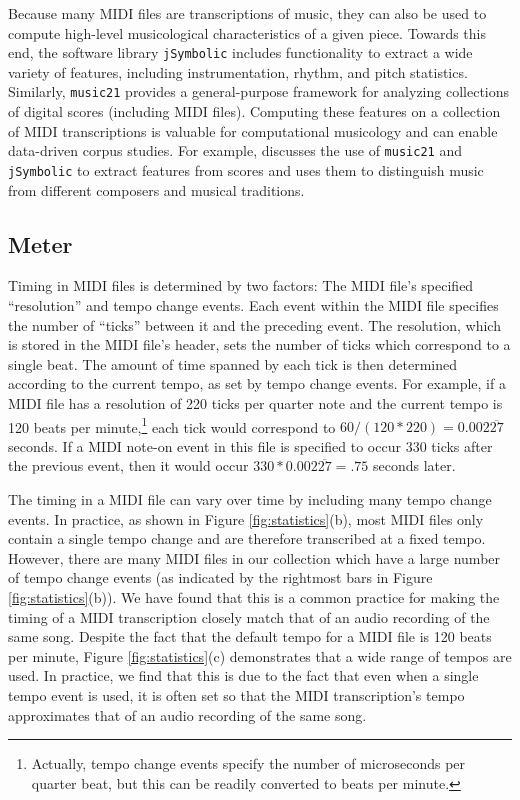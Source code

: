 \documentclass{article}
\begin{document}
Because many MIDI files are transcriptions of music, they can also be used to compute high-level musicological characteristics of a given piece.
Towards this end, the software library \texttt{jSymbolic} \cite{mckay2006jsymbolic} includes functionality to extract a wide variety of features, including instrumentation, rhythm, and pitch statistics.
Similarly, \texttt{music21} \cite{cuthbert2010music21} provides a general-purpose framework for analyzing collections of digital scores (including MIDI files).
Computing these features on a collection of MIDI transcriptions is valuable for computational musicology and can enable data-driven corpus studies.
For example, \cite{cuthbert2011feature} discusses the use of \texttt{music21} and \texttt{jSymbolic} to extract features from scores and uses them to distinguish music from different composers and musical traditions.

\subsection{Meter}

Timing in MIDI files is determined by two factors: The MIDI file's specified ``resolution'' and tempo change events.
Each event within the MIDI file specifies the number of ``ticks'' between it and the preceding event.
The resolution, which is stored in the MIDI file's header, sets the number of ticks which correspond to a single beat.
The amount of time spanned by each tick is then determined according to the current tempo, as set by tempo change events.
For example, if a MIDI file has a resolution of 220 ticks per quarter note and the current tempo is 120 beats per minute,\footnote{Actually, tempo change events specify the number of microseconds per quarter beat, but this can be readily converted to beats per minute.} each tick would correspond to $60/(120*220) = 0.002\overline{27}$ seconds.
If a MIDI note-on event in this file is specified to occur 330 ticks after the previous event, then it would occur $330*0.002\overline{27} = .75$ seconds later.

The timing in a MIDI file can vary over time by including many tempo change events.
In practice, as shown in Figure \ref{fig:statistics}(b), most MIDI files only contain a single tempo change and are therefore transcribed at a fixed tempo.
However, there are many MIDI files in our collection which have a large number of tempo change events (as indicated by the rightmost bars in Figure \ref{fig:statistics}(b)).
We have found that this is a common practice for making the timing of a MIDI transcription closely match that of an audio recording of the same song.
Despite the fact that the default tempo for a MIDI file is 120 beats per minute, Figure \ref{fig:statistics}(c) demonstrates that a wide range of tempos are used.
In practice, we find that this is due to the fact that even when a single tempo event is used, it is often set so that the MIDI transcription's tempo approximates that of an audio recording of the same song.
\end{document}
